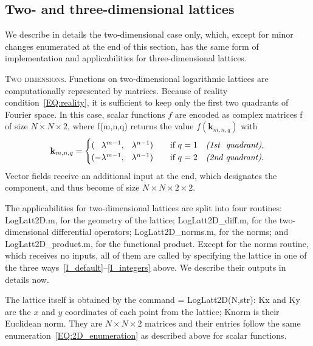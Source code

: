 \documentclass[12pt]{article}
\theoremstyle{definition}
\begin{document}
	\subsection{Two- and three-dimensional lattices}\label{SEC:ND}
	
	We describe in details the two-dimensional case only, which, except for minor changes enumerated at the end of this section, has the same form of implementation and applicabilities for three-dimensional lattices.
	
	\medskip
	\textsc{Two dimensions.} Functions on two-dimensional logarithmic lattices are computationally represented by matrices.
	Because of reality condition~\eqref{EQ:reality}, it is sufficient to keep only the first two quadrants of Fourier space.
	In this case, scalar functions $f$ are encoded as complex matrices {\mlttfamily f} of size $N \times N \times 2$, where
	{\mlttfamily f(m,n,q)} returns the value $f(\mathbf{k}_{m,n,q})$ with
	\begin{equation}
	\mathbf{k}_{m,n,q} =
	\begin{cases}
	(\phantom{-}\lambda^{m-1},\phantom{-}\lambda^{n-1}) \quad &\text{if} \ q=1 \quad \textit{(1st \phantom{-}quadrant)},\\
	(-\lambda^{m-1},\phantom{-}\lambda^{n-1}) \quad &\text{if} \ q=2 \quad \textit{(2nd quadrant)}.
	\end{cases}
	\label{EQ:2D_enumeration}
	\end{equation}
	Vector fields receive an additional input at the end, which designates the component, and thus become of size $N\times N \times 2 \times 2$.
	
	The applicabilities for two-dimensional lattices are split into four routines: {\mlttfamily LogLatt2D.m}, for the geometry of the lattice; {\mlttfamily LogLatt2D\_diff.m}, for the two-dimensional differential operators; {\mlttfamily LogLatt2D\_norms.m}, for the norms; and {\mlttfamily LogLatt2D\_product.m}, for the functional product.
	Except for the norms routine, which receives no inputs, all of them are called by specifying the lattice in one of the three ways~\ref{I_default}--\ref{I_integers} above.
	We describe their outputs in details now.
	
	The lattice itself is obtained by the command {\mlttfamily [Kx,Ky,Knorm] = LogLatt2D(N,str)}: {\mlttfamily Kx} and {\mlttfamily Ky} are the $x$ and $y$ coordinates of each point from the lattice; {\mlttfamily Knorm} is their Euclidean norm.
	They are $N \times N \times 2$ matrices and their entries follow the same enumeration~\eqref{EQ:2D_enumeration} as described above for scalar functions.
	
\end{document}
